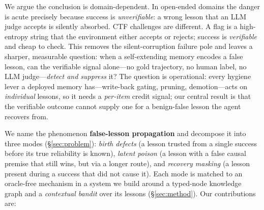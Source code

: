 \documentclass[10pt,twocolumn]{article}
\begin{document}
We argue the conclusion is domain-dependent. In open-ended domains the danger is
acute precisely because success is \emph{unverifiable}: a wrong lesson that an
LLM judge accepts is silently absorbed. CTF challenges are different. A flag is a
high-entropy string that the environment either accepts or rejects; success is
\emph{verifiable} and cheap to check. This removes the silent-corruption failure
pole and leaves a sharper, measurable question: when a self-extending memory
encodes a false lesson, can the verifiable signal alone---no gold trajectory, no
human label, no LLM judge---\emph{detect and suppress} it? The question is
operational: every hygiene lever a deployed memory has---write-back gating,
pruning, demotion---acts on \emph{individual} lessons, so it needs a
\emph{per-item} credit signal; our central result is that the verifiable outcome
cannot supply one for a benign-false lesson the agent recovers from.

We name the phenomenon \textbf{false-lesson propagation} and decompose it into
three modes (\S\ref{sec:problem}): \emph{birth defects} (a lesson trusted from a
single success before its true reliability is known), \emph{latent poison} (a
lesson with a false causal premise that still wins, but via a longer route), and
\emph{recovery masking} (a lesson present during a success that did not cause it).
Each mode is matched to an oracle-free mechanism in a system we build around a
typed-node knowledge graph and a \emph{contextual bandit} over its lessons
(\S\ref{sec:method}). Our contributions are:
\end{document}
